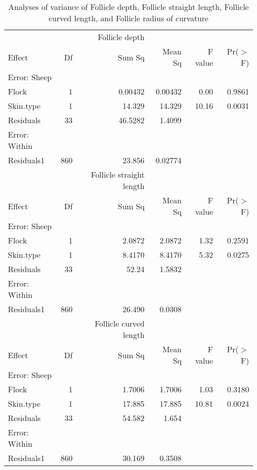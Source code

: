 \begin{table}[ht]
\centering
\caption{Analyses of variance of Follicle depth, Follicle straight length, Follicle curved length, and Follicle radius of curvature}
\label{tab:aov}
\begin{tabular}{lrrrrr}
  \hline
 & & Follicle depth & & & \\
 Effect & Df & Sum Sq & Mean Sq & F value & Pr($>$F) \\ 
  \hline
  Error: Sheep & & & & &  \\
Flock     & 1 & 0.00432 & 0.00432 & 0.00 & 0.9861 \\ 
  Skin.type & 1 & 14.329 & 14.329 & 10.16 & 0.0031 \\ 
  Residuals & 33 & 46.5282 & 1.4099 &  &  \\ 
  Error: Within & & & & &  \\
  Residuals1 & 860 & 23.856 & 0.02774 &  &  \\ 
   \hline

 & & Follicle straight length & & & \\
 Effect & Df & Sum Sq & Mean Sq & F value & Pr($>$F) \\ 
  \hline
  Error: Sheep & & & & &  \\
Flock     & 1 & 2.0872 & 2.0872 & 1.32 & 0.2591 \\ 
  Skin.type & 1 & 8.4170 & 8.4170 & 5.32 & 0.0275 \\ 
  Residuals & 33 & 52.24 & 1.5832 &  &  \\ 
  Error: Within & & & & &  \\
  Residuals1 & 860 & 26.490 & 0.0308 &  &  \\ 
   \hline

 & & Follicle curved length & & & \\
 Effect & Df & Sum Sq & Mean Sq & F value & Pr($>$F) \\ 
  \hline
  Error: Sheep & & & & &  \\
Flock     & 1 & 1.7006 & 1.7006 & 1.03 & 0.3180 \\ 
  Skin.type & 1 & 17.885 & 17.885 & 10.81 & 0.0024 \\ 
  Residuals & 33 & 54.582 & 1.654 &  &  \\ 
  Error: Within & & & & &  \\
  Residuals1 & 860 & 30.169 & 0.3508 &  &  \\ 
   \hline


\end{tabular}
\end{table}
